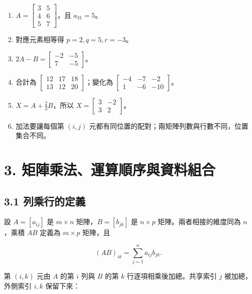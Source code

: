 \documentclass[11pt,a4paper]{article}
\providecommand{\tightlist}{%
  \setlength{\itemsep}{0pt}\setlength{\parskip}{0pt}}
\begin{document}
\begin{HandoutSelfCheck}
\begin{enumerate}
\def\labelenumi{\arabic{enumi}.}
\tightlist
\item
  \(\boxed{A=\begin{bmatrix}3&5\\4&6\\5&7\end{bmatrix}}\)，且 \(\boxed{a_{31}=5}\)。
\item
  對應元素相等得 \(\boxed{p=2,q=5,r=-3}\)。
\item
  \(\boxed{2A-B=\begin{bmatrix}-2&-5\\7&-5\end{bmatrix}}\)。
\item
  合計為 \(\boxed{\begin{bmatrix}12&17&18\\13&12&20\end{bmatrix}}\)；變化為 \(\boxed{\begin{bmatrix}-4&-7&-2\\1&-6&-10\end{bmatrix}}\)。
\item
  \(X=A+\frac23B\)，所以 \(\boxed{X=\begin{bmatrix}3&-2\\3&2\end{bmatrix}}\)。
\item
  加法要讓每個第 \((i,j)\) 元都有同位置的配對；兩矩陣列數與行數不同，位置集合不同。
\end{enumerate}

\end{HandoutSelfCheck}

\section{3. 矩陣乘法、運算順序與資料組合}\label{ux77e9ux9663ux4e58ux6cd5ux904bux7b97ux9806ux5e8fux8207ux8cc7ux6599ux7d44ux5408}

\subsection{3.1 列乘行的定義}\label{ux5217ux4e58ux884cux7684ux5b9aux7fa9}

設 \(A=[a_{ij}]\) 是 \(m\times n\) 矩陣，\(B=[b_{jk}]\) 是 \(n\times p\) 矩陣。兩者相接的維度同為 \(n\)，乘積 \(AB\) 定義為 \(m\times p\) 矩陣，且

\[
(AB)_{ik}=\sum_{j=1}^{n}a_{ij}b_{jk}.
\]

第 \((i,k)\) 元由 \(A\) 的第 \(i\) 列與 \(B\) 的第 \(k\) 行逐項相乘後加總。共享索引 \(j\) 被加總，外側索引 \(i,k\) 保留下來：
\end{document}
